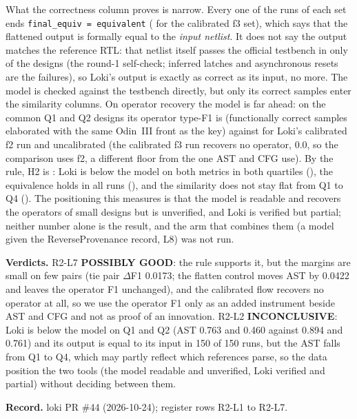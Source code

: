 \documentclass[conference]{IEEEtran}
\newcommand{\verdict}[1]{\textbf{\textsc{#1}}}
\newcommand{\hev}[1]{\par\smallskip\noindent\textbf{#1}}
\newcommand{\code}[1]{\texttt{#1}}
\begin{document}
What the correctness column proves is narrow. Every one of the \rtLtwoEquivRuns{} runs of each
set ends \code{final\_equiv = equivalent} (\rtLtwoEquivOk{} for the calibrated f3 set), which
says that the flattened output is formally equal to the \emph{input netlist}. It does not say
the output matches the reference RTL: that netlist itself passes the official testbench in only
\rtLtwoSelfOk{} of the \rtLtwoDesigns{} designs (the round-1 self-check; inferred latches and asynchronous
resets are the failures), so Loki's output is exactly as correct as its input, no more. The
model is checked against the testbench directly, but only its correct samples enter the
similarity columns. On operator recovery the model is far ahead: on the common Q1 and
Q2 designs its operator type-F1 is \rtLtwoOpsLlm{} (functionally correct samples elaborated with
the same Odin~III front as the key) against \rtLtwoOpsLokiCal{} for Loki's calibrated f2 run and
\rtLtwoOpsLokiNone{} uncalibrated (the calibrated f3 run recovers no operator, 0.0, so the
comparison uses f2, a different floor from the one AST and CFG use). By the rule, H2 is \rtLtwoStatus: Loki is below the model
on both metrics in both quartiles (\rtLtwoCondA), the equivalence holds in all runs
(\rtLtwoCondC), and the similarity does not stay flat from Q1 to Q4 (\rtLtwoCondB). The
positioning this measures is that the model is readable and recovers the operators of small
designs but is unverified, and Loki is verified but partial; neither number alone is the
result, and the arm that combines them (a model given the ReverseProvenance record, L8) was
not run.




\hev{Verdicts.} R2-L7 \verdict{POSSIBLY GOOD}: the rule supports it, but the margins are small on few pairs (tie
pair $\Delta$F1 0.0173; the flatten control moves AST by 0.0422 and leaves the operator F1 unchanged), and the
calibrated flow recovers no operator at all, so we use the operator F1 only as an added instrument beside AST and CFG
and not as proof of an innovation. R2-L2 \verdict{INCONCLUSIVE}: Loki is below the model on Q1 and Q2 (AST
0.763 and 0.460 against 0.894 and 0.761) and its output is equal to its input in 150 of 150 runs, but the AST falls
from Q1 to Q4, which may partly reflect which references parse, so the data position the two tools (the model readable
and unverified, Loki verified and partial) without deciding between them.


\hev{Record.} loki PR \#44 (2026-10-24); register rows R2-L1 to R2-L7.
\end{document}
